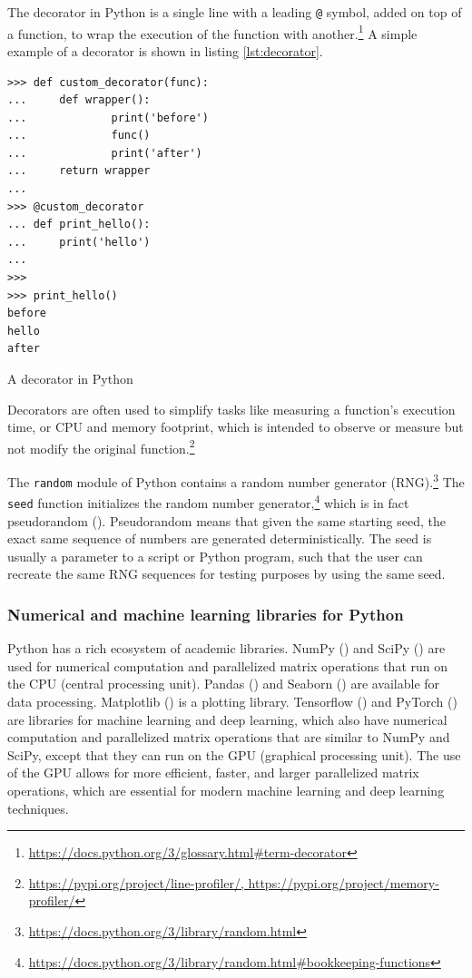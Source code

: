 \documentclass[report.tex]{subfiles}
\begin{document}
The decorator in Python is a single line with a leading \Verb#@# symbol, added on top of a function, to wrap the execution of the function with another.\footnote{\url{https://docs.python.org/3/glossary.html\#term-decorator}} A simple example of a decorator is shown in listing \ref{lst:decorator}.

\begin{listing}[ht]
\centering
\begin{BVerbatim}
>>> def custom_decorator(func):
...     def wrapper():
...             print('before')
...             func()
...             print('after')
...     return wrapper
...
>>> @custom_decorator
... def print_hello():
...     print('hello')
...
>>>
>>> print_hello()
before
hello
after
\end{BVerbatim}
	\caption{A decorator in Python}
	\label{lst:decorator}
\end{listing}

Decorators are often used to simplify tasks like measuring a function's execution time, or CPU and memory footprint, which is intended to observe or measure but not modify the original function.\footnote{\url{https://pypi.org/project/line-profiler/, https://pypi.org/project/memory-profiler/}}

The \Verb#random# module of Python contains a random number generator (RNG).\footnote{\url{https://docs.python.org/3/library/random.html}} The \Verb#seed# function initializes the random number generator,\footnote{\url{https://docs.python.org/3/library/random.html\#bookkeeping-functions}} which is in fact pseudorandom (\cite{pseudorng}). Pseudorandom means that given the same starting seed, the exact same sequence of numbers are generated deterministically. The seed is usually a parameter to a script or Python program, such that the user can recreate the same RNG sequences for testing purposes by using the same seed.

\subsubsection{Numerical and machine learning libraries for Python}

Python has a rich ecosystem of academic libraries. NumPy (\cite{numpy}) and SciPy (\cite{scipy}) are used for numerical computation and parallelized matrix operations that run on the CPU (central processing unit). Pandas (\cite{pandas}) and Seaborn (\cite{seaborn}) are available for data processing. Matplotlib (\cite{matplotlib}) is a plotting library. Tensorflow (\cite{tensorflow}) and PyTorch (\cite{pytorch}) are libraries for machine learning and deep learning, which also have numerical computation and parallelized matrix operations that are similar to NumPy and SciPy, except that they can run on the GPU (graphical processing unit). The use of the GPU allows for more efficient, faster, and larger parallelized matrix operations, which are essential for modern machine learning and deep learning techniques.
\end{document}
